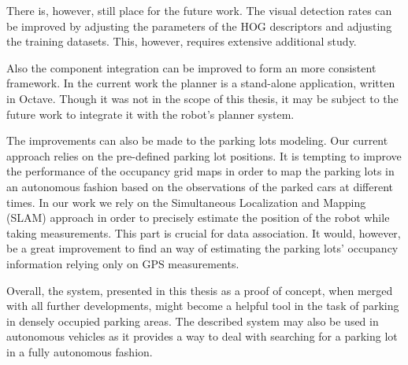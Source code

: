     There is, however, still place for the future work. The visual detection
    rates can be improved by adjusting the parameters of the HOG descriptors
    and adjusting the training datasets. This, however, requires extensive
    additional study.

    Also the component integration can be improved to form an more consistent
    framework. In the current work the planner is a stand-alone application,
    written in Octave. Though it was not in the scope of this thesis, it may
    be subject to the future work to integrate it with the robot's planner
    system.

    The improvements can also be made to the parking lots modeling. Our
    current approach relies on the pre-defined parking lot positions. It is
    tempting to improve the performance of the occupancy grid maps in order to
    map the parking lots in an autonomous fashion based on the observations of
    the parked cars at different times. In our work we rely on the
    Simultaneous Localization and Mapping (SLAM) approach in order to
    precisely estimate the position of the robot while taking measurements.
    This part is crucial for data association. It would, however, be a great
    improvement to find an way of estimating the parking lots' occupancy
    information relying only on GPS measurements.

    Overall, the system, presented in this thesis as a proof of concept, when
    merged with all further developments, might become a helpful tool in the
    task of parking in densely occupied parking areas. The described system
    may also be used in autonomous vehicles as it provides a way to deal with
    searching for a parking lot in a fully autonomous fashion.

